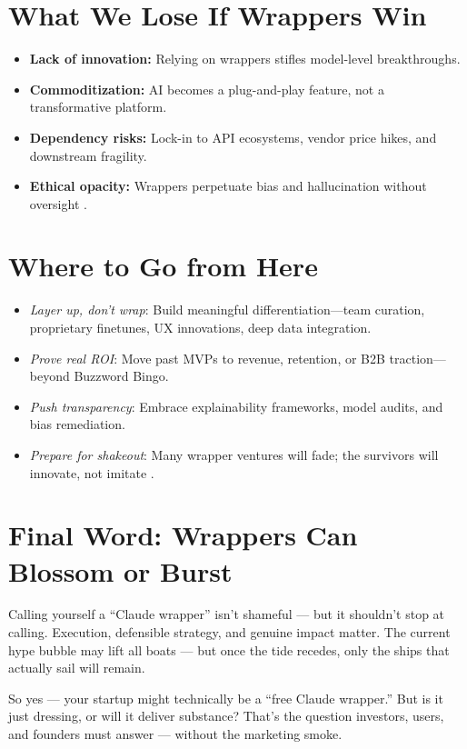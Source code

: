 \section{What We Lose If Wrappers Win}

\begin{itemize}
	\item \textbf{Lack of innovation:} Relying on wrappers stifles model-level breakthroughs.
	\item \textbf{Commoditization:} AI becomes a plug-and-play feature, not a transformative platform.
	\item \textbf{Dependency risks:} Lock-in to API ecosystems, vendor price hikes, and downstream fragility.
	\item \textbf{Ethical opacity:} Wrappers perpetuate bias and hallucination without oversight \cite{wsj2025steam}.
\end{itemize}

\section{Where to Go from Here}

\begin{itemize}
	\item \emph{Layer up, don't wrap}: Build meaningful differentiation---team curation, proprietary finetunes, UX innovations, deep data integration.
	\item \emph{Prove real ROI}: Move past MVPs to revenue, retention, or B2B traction---beyond Buzzword Bingo.
	\item \emph{Push transparency}: Embrace explainability frameworks, model audits, and bias remediation.
	\item \emph{Prepare for shakeout}: Many wrapper ventures will fade; the survivors will innovate, not imitate \cite{reddit2025wrapper}.
\end{itemize}

\section{Final Word: Wrappers Can Blossom or Burst}

Calling yourself a ``Claude wrapper'' isn't shameful ---
but it shouldn't stop at calling. Execution, defensible strategy, and genuine impact matter.
The current hype bubble may lift all boats --- but once the tide recedes, only the ships that actually sail will remain.

So yes --- your startup might technically be a ``free Claude wrapper.''
But is it just dressing, or will it deliver substance?
That's the question investors, users, and founders must answer --- without the marketing smoke.

\printbibliography

